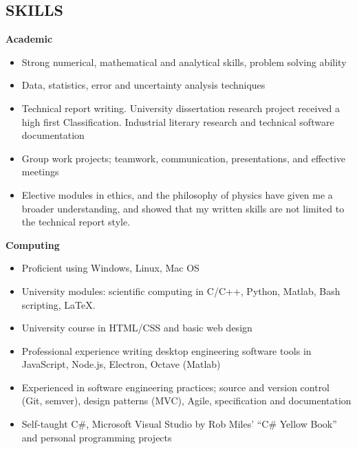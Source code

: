 \documentclass[margin, line, 10pt]{res} %
\begin{document}
\begin{resume}
 
\section{SKILLS}

\textbf{Academic}  


\begin{itemize}
\item Strong numerical, mathematical and analytical skills, problem solving ability 

\item Data, statistics, error and uncertainty analysis techniques

\item Technical report writing. University dissertation research project received a high first Classification. Industrial literary research and technical software documentation

\item Group work projects; teamwork, communication, presentations, and effective meetings

\item Elective modules in ethics, and the philosophy of physics have given me a broader understanding, and showed that my written skills are not limited to the technical report style.
\end{itemize}

\textbf{Computing}  
\begin{itemize} 
\item Proficient using Windows, Linux, Mac OS
\item University modules: scientific computing in C/C++, Python, Matlab, Bash scripting, LaTeX.
\item University course in HTML/CSS and basic web design

\item Professional experience writing desktop engineering software tools in JavaScript, Node.js, Electron, Octave (Matlab)

\item Experienced in software engineering practices; source and version control (Git, semver), design patterns (MVC), Agile, specification and documentation

\item Self-taught C\#, Microsoft Visual Studio by Rob Miles' ``C\# Yellow Book'' and personal programming projects
\end{itemize}


\end{resume}
\end{document}
